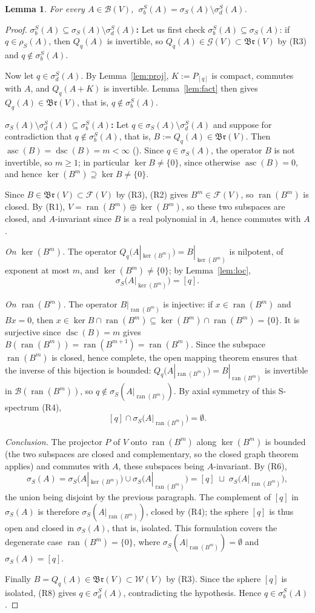 \documentclass[11pt,a4paper]{article}
\theoremstyle{plain}
\newtheorem{lemma}{Lemma}[section]
\theoremstyle{remark}
\newcommand{\V}{V}
\newcommand{\B}{\mathcal B}
\newcommand{\F}{\mathcal F}
\newcommand{\W}{\mathcal W}
\newcommand{\G}{\mathcal G}
\newcommand{\Br}{\mathfrak{Br}}
\newcommand{\sS}{\sigma_S}
\newcommand{\sigb}{\sigma_b^S}
\newcommand{\sd}{\sigma_d^S}
\newcommand{\rS}{\rho_S}
\DeclareMathOperator{\ran}{ran}
\DeclareMathOperator{\asc}{asc}
\DeclareMathOperator{\dsc}{dsc}
\newcommand{\Qq}[1]{Q_q(#1)}
\begin{document}
\begin{lemma}\label{lem:A}
For every $A\in\B(\V)$, $\ \sigb(A)=\sS(A)\setminus\sd(A)$.
\end{lemma}
\begin{proof}
\textbf{$\sigb(A)\subseteq\sS(A)\setminus\sd(A)$:}
Let us first check $\sigb(A)\subseteq\sS(A)$: if $q\in\rS(A)$, then $\Qq{A}$ is invertible, so $\Qq{A}\in\G(\V)\subset\Br(\V)$ by (R3) and $q\notin\sigb(A)$.

Now let $q\in\sd(A)$. By Lemma~\ref{lem:proj}, $K:=P_{[q]}$ is compact, commutes with $A$, and $\Qq{A+K}$ is invertible. Lemma~\ref{lem:fact} then gives $\Qq{A}\in\Br(\V)$, that is, $q\notin\sigb(A)$.

\medskip
\textbf{$\sS(A)\setminus\sd(A)\subseteq\sigb(A)$:}
Let $q\in\sS(A)\setminus\sd(A)$ and suppose for contradiction that $q\notin\sigb(A)$, that is, $B:=\Qq{A}\in\Br(\V)$. Then $\asc(B)=\dsc(B)=m<\infty$ (\cite[Lemma~7.3(b)]{MT19}). Since $q\in\sS(A)$, the operator $B$ is not invertible, so $m\ge1$; in particular $\ker B\ne\{0\}$, since otherwise $\asc(B)=0$, and hence $\ker(B^m)\supseteq\ker B\ne\{0\}$.

Since $B\in\Br(\V)\subset\F(\V)$ by (R3), (R2) gives $B^m\in\F(\V)$, so $\ran(B^m)$ is closed. By (R1), $\V=\ran(B^m)\oplus\ker(B^m)$, so these two subspaces are closed, and $A$-invariant since $B$ is a real polynomial in $A$, hence commutes with $A$.

\emph{On $\ker(B^m)$.} The operator $Q_q\big(A|_{\ker(B^m)}\big)=B|_{\ker(B^m)}$ is nilpotent, of exponent at most $m$, and $\ker(B^m)\ne\{0\}$; by Lemma~\ref{lem:loc},
\[
\sS\big(A|_{\ker(B^m)}\big)=[q].
\]

\emph{On $\ran(B^m)$.} The operator $B|_{\ran(B^m)}$ is injective: if $x\in\ran(B^m)$ and $Bx=0$, then $x\in\ker B\cap\ran(B^m)\subseteq\ker(B^m)\cap\ran(B^m)=\{0\}$. It is surjective since $\dsc(B)=m$ gives $B(\ran(B^m))=\ran(B^{m+1})=\ran(B^m)$. Since the subspace $\ran(B^m)$ is closed, hence complete, the open mapping theorem ensures that the inverse of this bijection is bounded: $Q_q(A|_{\ran(B^m)})=B|_{\ran(B^m)}$ is invertible in $\B(\ran(B^m))$, so $q\notin\sS(A|_{\ran(B^m)})$. By axial symmetry of this S-spectrum (R4),
\[
[q]\cap\sS\big(A|_{\ran(B^m)}\big)=\emptyset.
\]

\emph{Conclusion.} The projector $P$ of $\V$ onto $\ran(B^m)$ along $\ker(B^m)$ is bounded (the two subspaces are closed and complementary, so the closed graph theorem applies) and commutes with $A$, these subspaces being $A$-invariant. By (R6),
\[
\sS(A)=\sS\big(A|_{\ker(B^m)}\big)\cup\sS\big(A|_{\ran(B^m)}\big)=[q]\;\sqcup\;\sS\big(A|_{\ran(B^m)}\big),
\]
the union being disjoint by the previous paragraph. The complement of $[q]$ in $\sS(A)$ is therefore $\sS(A|_{\ran(B^m)})$, closed by (R4); the sphere $[q]$ is thus open and closed in $\sS(A)$, that is, isolated. This formulation covers the degenerate case $\ran(B^m)=\{0\}$, where $\sS(A|_{\ran(B^m)})=\emptyset$ and $\sS(A)=[q]$.

Finally $B=\Qq{A}\in\Br(\V)\subset\W(\V)$ by (R3). Since the sphere $[q]$ is isolated, (R8) gives $q\in\sd(A)$, contradicting the hypothesis. Hence $q\in\sigb(A)$.
\end{proof}
\end{document}
